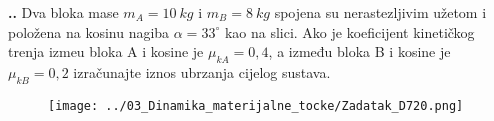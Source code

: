 

\noindent 
\textbf{
\thecjelina.\thezadatak.}
Dva bloka mase $m_A = 10\ kg$ i $m_B = 8\ kg$ spojena su nerastezljivim užetom i položena na kosinu
nagiba $\alpha = 33^\circ$ kao na slici. Ako je koeficijent kineti\v{c}kog trenja izme\dj{}u bloka A i kosine je 
$\mu_{kA} = 0,4$,
a između bloka B i kosine je $\mu_{kB} = 0,2$ izra\v{c}unajte iznos ubrzanja cijelog sustava.
\begin{figure}[h]%
  \begin{center}
    \texttt{[image: ../03\_Dinamika\_materijalne\_tocke/Zadatak\_D720.png]}
  \end{center}
\end{figure}

